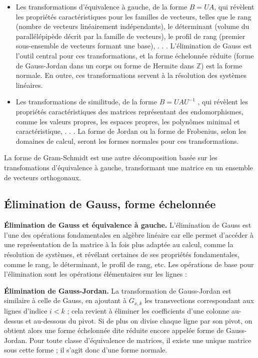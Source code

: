 \begin{itemize}
 	 \item Les transformations d’équivalence à gauche, de la forme $B = UA$, qui
révèlent les propriétés caractéristiques pour les familles de vecteurs, telles
que le rang (nombre de vecteurs linéairement indépendants), le déterminant
(volume du parallélépipède décrit par la famille de vecteurs), le profil de rang
(premier sous-ensemble de vecteurs formant une base), . . . L’élimination de
Gauss est l’outil central pour ces transformations, et la forme échelonnée
réduite (forme de Gauss-Jordan dans un corps ou forme de Hermite dans $\mathbb{Z}$)
est la forme normale. En outre, ces transformations servent à la résolution
des systèmes linéaires.
	 \item  Les transformations de similitude, de la forme $B = UAU^{-1}$ , qui révèlent les
propriétés caractéristiques des matrices représentant des endomorphismes,
comme les valeurs propres, les espaces propres, les polynômes minimal et
caractéristique, . . . La forme de Jordan ou la forme de Frobenius, selon les
domaines de calcul, seront les formes normales pour ces transformations.
\end{itemize}

La forme de Gram-Schmidt est une autre décomposition basée sur les transfomations d’équivalence à gauche, transformant une matrice en un ensemble de vecteurs orthogonaux.

\subsection{ Élimination de Gauss, forme échelonnée}

\begin{flushleft}
\textbf{Élimination de Gauss et équivalence à gauche.} L’élimination de Gauss est l’une des opérations fondamentales en algèbre linéaire car elle permet d’accéder à une représentation de la matrice à la fois plus adaptée au calcul, comme la résolution de systèmes, et révélant certaines de ses propriétés fondamentales,
comme le rang, le déterminant, le profil de rang, etc. Les opérations de base pour l’élimination sont les opérations élémentaires sur les lignes :
\end{flushleft}

\begin{flushleft}
\textbf{Élimination de Gauss-Jordan.} La transformation de Gauss-Jordan est similaire à celle de Gauss, en ajoutant à $G_{x,k}$ les transvections correspondant aux lignes d’indice $i < k$ ; cela revient à éliminer les coefficients d’une colonne au-dessus et au-dessous du pivot. Si de plus on divise chaque ligne par son pivot, on obtient alors une forme échelonnée dite réduite encore appelée forme de Gauss-Jordan. Pour toute classe d’équivalence de matrices, il existe une unique matrice sous cette forme ; il s’agit donc d’une forme normale.
\end{flushleft}

